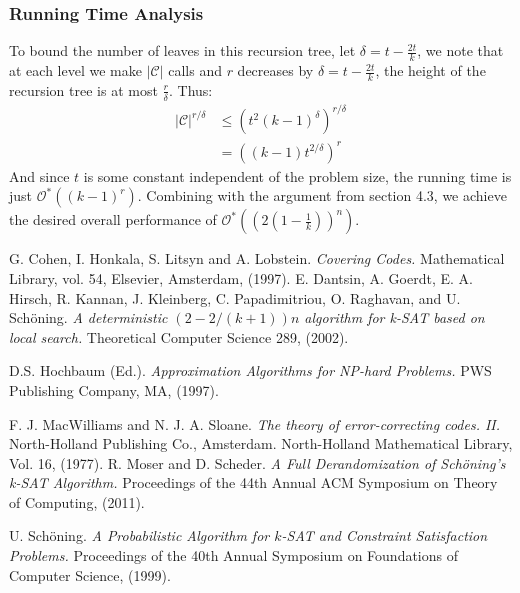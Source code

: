 \documentclass[a4paper,12pts]{article}
\renewcommand{\O}{\mathcal{O}^*}
\begin{document}
\subsubsection{Running Time Analysis}
	To bound the number of leaves in this recursion tree, let $\delta = t-\frac{2t}{k}$, we note that at each level we make $|\mathcal{C}|$ calls and $r$ decreases by $\delta = t-\frac{2t}{k}$, the height of the recursion tree is at most $\frac{r}{\delta}$. Thus:
	\begin{align*}
	|\mathcal{C}|^{r/\delta} &\leq (t^{2}(k-1)^{\delta})^{r/\delta}\\
	&= ((k-1)t^{2/\delta})^{r}
	\end{align*}
	And since $t$ is some constant independent of the problem size, the running time is just $\O((k-1)^{r})$. Combining with the argument from section 4.3, we achieve the desired overall performance of $\O((2(1-\frac{1}{k}))^n)$.
\begin{thebibliography}{9}
	
G. Cohen, I. Honkala, S. Litsyn and A. Lobstein.
\textit{Covering Codes.}
Mathematical Library, vol. 54, Elsevier, Amsterdam, (1997).
E. Dantsin, A. Goerdt, E. A. Hirsch, R. Kannan, J. Kleinberg, C. Papadimitriou, O. Raghavan, and U. Sch\"{o}ning. 
\textit{A deterministic $(2-2/(k+1))n$ algorithm for k-SAT based on local search.} Theoretical Computer Science 289, (2002).

D.S. Hochbaum (Ed.).
\textit{Approximation Algorithms for NP-hard Problems.}
PWS Publishing Company, MA, (1997).

F. J. MacWilliams and N. J. A. Sloane.
\textit{The theory of error-correcting codes. II.}
North-Holland Publishing Co., Amsterdam. North-Holland Mathematical Library, Vol. 16, (1977).
R. Moser and D. Scheder.
\textit{A Full Derandomization of Sch\"{o}ning’s k-SAT Algorithm.} Proceedings of the 44th Annual ACM Symposium on Theory of Computing, (2011).

U. Sch\"{o}ning.
\textit{A Probabilistic Algorithm for $k$-SAT and Constraint Satisfaction Problems.} Proceedings of the 40th Annual Symposium on Foundations of Computer Science, (1999).

\end{thebibliography}
\end{document}
